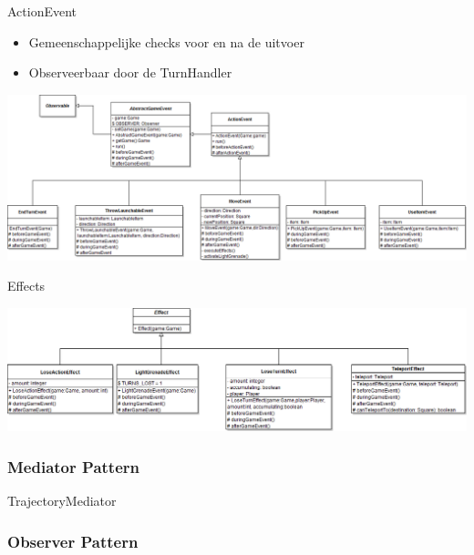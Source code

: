 \documentclass[t]{beamer}
\begin{document}
\begin{frame}{ActionEvent}
\begin{center}
\begin{itemize}
	\item Gemeenschappelijke checks voor en na de uitvoer
	\item Observeerbaar door de TurnHandler
\end{itemize}
\vspace{0.1in}
\includegraphics[width=1\linewidth]{images/ActionEvents}
\end{center}
\end{frame}

\begin{frame}{Effects}
\begin{center}
\includegraphics[width=0.75\linewidth]{images/Effects}
\end{center}
\end{frame}

\subsubsection{Mediator Pattern}
\begin{frame}{TrajectoryMediator}
\begin{center}
\end{center}
\end{frame}

\subsubsection{Observer Pattern}
\begin{frame}
\begin{center}

\end{center}
\end{frame}
\end{document}
